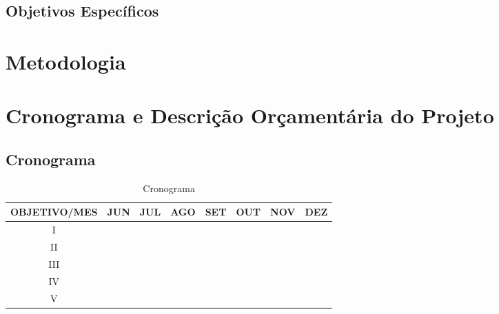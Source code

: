 \documentclass[
	12pt,				%
	openright,			%
	oneside,			%
	a4paper,			%
	english,			%
	french,				%
	spanish,			%
	brazil,				%
	]{abntex2}
\begin{document}
\subsection*{Objetivos Específicos}
\section*{Metodologia}
\section*{Cronograma e Descrição Orçamentária do Projeto}
\subsection*{Cronograma}

	\begin{table}[]
		\centering
		\caption{Cronograma}
		\label{my-label}
		\begin{tabular}{|c|c|c|c|c|c|c|c|}
			\hline
			OBJETIVO/MES & JUN & JUL & AGO & SET & OUT & NOV & DEZ \\ \hline
			I &  & & & & & & \\ \hline
			II &  & & & & & & \\ \hline
			III &  & & & & & & \\ \hline
			IV &  & & & & & & \\ \hline
			V &  & & & & & & \\ \hline
		\end{tabular}
	\end{table}


\end{document}
